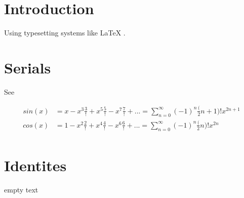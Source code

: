 \documentclass{article}
\begin{document}


\section{Introduction}


Using typesetting systems like \LaTeX{} \cite{wiki:latex}.
\section{Serials}

See \cite{wiki:tri_func}

\begin{align*}
  sin(x) &= x - {x^3 \frac 3!} + {x^5 \frac 5!} - {x^7 \frac 7!} + ... =
           \sum_{n=0}^\infty {(-1)^n \frac (2n+1)!} x^{2n+1}\\
  cos(x) &= 1 - {x^2 \frac 2!} + {x^4 \frac 4!} - {x^6 \frac 6!} + ... =
           \sum_{n=0}^\infty {(-1)^n \frac (2n)!} x^{2n}\\
\end{align*}

\section{Identites}

empty text \cite{blackholes}


\end{document}
